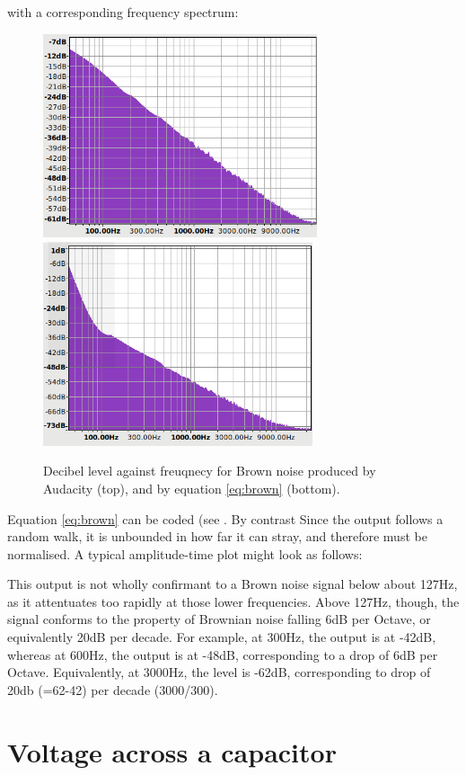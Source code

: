 \documentclass[a4paper,10pt]{article}
\begin{document}
with a corresponding frequency spectrum:

\begin{figure}[!]
	\centering
	\includegraphics[height=6cm]{brown-freq-audacity.png}
	\includegraphics[height=6cm]{brown-freq.png}
	\caption{Decibel level against freuqnecy for Brown noise produced by Audacity (top), and by equation \ref{eq:brown} (bottom).}
	\label{fig:ba1}
\end{figure}

 
Equation \ref{eq:brown} can be coded (see . By contrast
Since the output follows a random walk, it is unbounded in how far it can stray, and therefore must be normalised. A typical amplitude-time plot might look as follows:


This output is not wholly confirmant to a Brown noise signal below about 127Hz, 
as it attentuates too rapidly at those lower frequencies. Above 127Hz, though, 
the signal conforms to the property of Brownian noise falling 6dB per Octave, 
or equivalently 20dB per decade\cite{brown}. For example, at 300Hz, the output 
is at -42dB, whereas at 600Hz, the output is at -48dB, corresponding to a drop 
of 6dB per Octave. Equivalently, at 3000Hz, the level is -62dB, corresponding 
to drop of 20db (=62-42) per decade (3000/300).


\section{Voltage across a capacitor}
\end{document}
